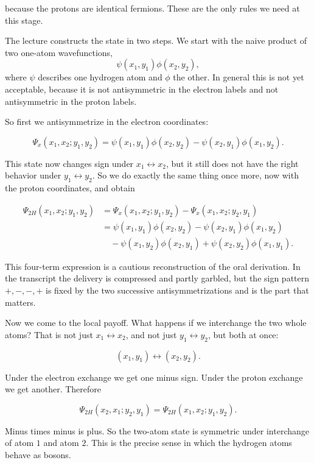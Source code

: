because the protons are identical fermions. These are the only rules we need at this stage.

The lecture constructs the state in two steps. We start with the naive product of two one-atom wavefunctions,
\[
\psi(x_1,y_1)\phi(x_2,y_2),
\]
where \(\psi\) describes one hydrogen atom and \(\phi\) the other. In general this is not yet acceptable, because it is not antisymmetric in the electron labels and not antisymmetric in the proton labels.

So first we antisymmetrize in the electron coordinates:

\begin{equation}
\Psi_x(x_1,x_2;y_1,y_2)
=
\psi(x_1,y_1)\phi(x_2,y_2)
-
\psi(x_2,y_1)\phi(x_1,y_2).
\end{equation}

This state now changes sign under \(x_1\leftrightarrow x_2\), but it still does not have the right behavior under \(y_1\leftrightarrow y_2\). So we do exactly the same thing once more, now with the proton coordinates, and obtain

\begin{align}
\Psi_{2H}(x_1,x_2;y_1,y_2)
&=
\Psi_x(x_1,x_2;y_1,y_2)-\Psi_x(x_1,x_2;y_2,y_1)\\
&=
\psi(x_1,y_1)\phi(x_2,y_2)
-\psi(x_2,y_1)\phi(x_1,y_2)\nonumber\\
&\quad
-\psi(x_1,y_2)\phi(x_2,y_1)
+\psi(x_2,y_2)\phi(x_1,y_1).
\end{align}

This four-term expression is a cautious reconstruction of the oral derivation. In the transcript the delivery is compressed and partly garbled, but the sign pattern \(+,-,-,+\) is fixed by the two successive antisymmetrizations and is the part that matters.

Now we come to the local payoff. What happens if we interchange the two whole atoms? That is not just \(x_1\leftrightarrow x_2\), and not just \(y_1\leftrightarrow y_2\), but both at once:

\[
(x_1,y_1)\longleftrightarrow(x_2,y_2).
\]

Under the electron exchange we get one minus sign. Under the proton exchange we get another. Therefore

\begin{equation}
\Psi_{2H}(x_2,x_1;y_2,y_1)=\Psi_{2H}(x_1,x_2;y_1,y_2).
\end{equation}

Minus times minus is plus. So the two-atom state is symmetric under interchange of atom \(1\) and atom \(2\). This is the precise sense in which the hydrogen atoms behave as bosons.

